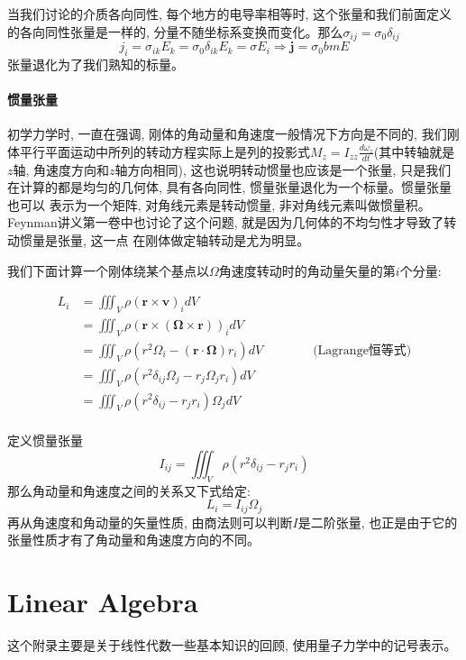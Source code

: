 当我们讨论的介质各向同性, 每个地方的电导率相等时, 这个张量和我们前面定义的各向同性张量是一样的, 分量不随坐标系变换而变化。那么$\sigma_{ij}=\sigma_0\delta_{ij}$
$$j_i=\sigma_{ik}E_k=\sigma_0\delta_{ik}E_k=\sigma E_i\Rightarrow\bm{j}=\sigma_0bm{E}$$张量退化为了我们熟知的标量。
\subsubsection*{惯量张量}
初学力学时, 一直在强调, 刚体的角动量和角速度一般情况下方向是不同的, 我们刚体平行平面运动中所列的转动方程实际上是列的投影式$M_z=I_{zz}\frac{d\omega_z}{dt}$(其中转轴就是
$z$轴, 角速度方向和$z$轴方向相同), 这也说明转动惯量也应该是一个张量, 只是我们在计算的都是均匀的几何体, 具有各向同性, 惯量张量退化为一个标量。惯量张量也可以
表示为一个矩阵, 对角线元素是转动惯量, 非对角线元素叫做惯量积。Feynman讲义第一卷中也讨论了这个问题, 就是因为几何体的不均匀性才导致了转动惯量是张量, 这一点
在刚体做定轴转动是尤为明显。

我们下面计算一个刚体绕某个基点以$\Omega$角速度转动时的角动量矢量的第$i$个分量:
\begin{center}
    \begin{equation*}
        \displaystyle
        \begin{split}
            L_i&=\iiint_V \rho(\bm{r}\times\bm{v})_idV\\
               &=\iiint_V \rho(\bm{r}\times\left(\bm{\Omega}\times\bm{r}\right))_idV\\
               &=\iiint_V \rho\left(r^2\Omega_i-\left(\bm{r}\cdot\bm{\Omega}\right)r_i\right)dV \qquad\qquad\text{(Lagrange恒等式)}\\
               &=\iiint_V \rho\left(r^2\delta_{ij}\Omega_j-r_j\Omega_jr_i\right)dV\\
               &=\iiint_V \rho\left(r^2\delta_{ij}-r_jr_i\right)\Omega_jdV\\
        \end{split}
    \end{equation*}
\end{center}    
定义惯量张量$$I_{ij}=\iiint_V \rho\left(r^2\delta_{ij}-r_jr_i\right)$$
那么角动量和角速度之间的关系又下式给定:
$$L_i=I_{ij}\Omega_j$$
再从角速度和角动量的矢量性质, 由商法则可以判断$I$是二阶张量, 也正是由于它的张量性质才有了角动量和角速度方向的不同。



\chapter{Linear Algebra}
这个附录主要是关于线性代数一些基本知识的回顾, 使用量子力学中的记号表示。

